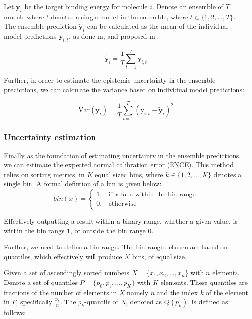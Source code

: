 Let $\mathbf{y}_i$ be the target binding energy for molecule $i$. Denote an ensemble of $T$ models where $t$ denotes a single model in the ensemble,
where $t \in \{1,2,\ldots,T\}$.
The ensemble prediction $\tilde{\mathbf{y}}_i$ can be calculated as the mean of the individual
model predictions $\mathbf{y}_{i,t}$, as done in\cite{Tran2019}, and proposed in \cite{Scalia2019}:

\begin{equation}\label{eq:mean-ensemble}
    \tilde{\mathbf{y}}_{i} = \frac{1}{T} \sum_{t=1}^{T} \mathbf{y}_{i,t}
\end{equation}

Further, in order to estimate the epistemic uncertainty in the ensemble predictions, we can calculate the variance based on individual model
predictions\cite{Tran2019}:

\begin{equation}\label{eq:variance-ensemble}
    \text{Var}(\mathbf{y}_{i}) = \frac{1}{T} \sum_{t=1}^T (\mathbf{y}_{i,t} - \tilde{\mathbf{y}}_i)^2
\end{equation}

\subsubsection{Uncertainty estimation}

Finally as the foundation of estimating uncertainty in the ensemble predictions, we can estimate the expected normal calibration error (ENCE).
This method relies on sorting metrics, in $K$ equal sized bins, where $k \in \{1,2,\ldots,K\}$ denotes a single bin.
A formal defintion of a bin is given below:
\begin{equation}\label{eq:bin}
    bin(x) = \begin{cases}
        1, & \text{if } x \text{ falls within the bin range} \\
        0, & \text{otherwise}
    \end{cases}
\end{equation}

Effectively outputting a result within a binary range, whether a given value, is within the bin range $1$, or outside the bin range $0$.

Further, we need to define a bin range. The bin ranges chosen are based on quantiles, which effectively will produce $K$ bins, of equal size.

Given a set of ascendingly sorted numbers $X = \{x_1, x_2, ..., x_n\}$ with $n$ elements. Denote a set of quantiles $P = \{p_0, p_1, ..., p_K\}$ with $K$ elements.
These quantiles are fractions of the number of elements in $X$ namely $n$ and the index $k$ of the element in $P$, specifically $\frac{p_{k}}{n}$.
The $p_{k}$-quantile of $X$, denoted as $Q(p_{k})$, is defined as follows:

